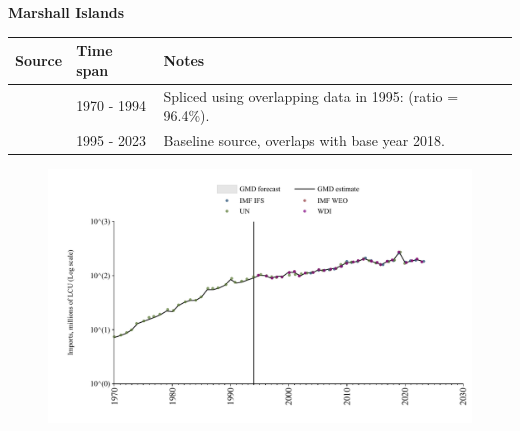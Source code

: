 \documentclass[12pt,a4paper,landscape]{article}
\begin{document}
\begin{adjustbox}{max totalsize={\paperwidth}{\paperheight},center}
\begin{minipage}[t][\textheight][t]{\textwidth}
\vspace*{0.5cm}
{}
\begin{center}
{\Large\bfseries Marshall Islands}
\end{center}
\vspace{0.5cm}
\begin{table}[H]
\centering
\small
\begin{tabular}{|l|l|l|}
\hline
\textbf{Source} & \textbf{Time span} & \textbf{Notes} \\
\hline
\rowcolor{white}\cite{UN}& 1970 - 1994 &Spliced using overlapping data in 1995: (ratio = 96.4\%).\\
\rowcolor{lightgray}\cite{WDI}& 1995 - 2023 &Baseline source, overlaps with base year 2018.\\
\hline
\end{tabular}
\end{table}
\begin{figure}[H]
\centering
\includegraphics[width=\textwidth,height=0.6\textheight,keepaspectratio]{graphs/MHL_imports.pdf}
\end{figure}
\end{minipage}
\end{adjustbox}
\end{document}
